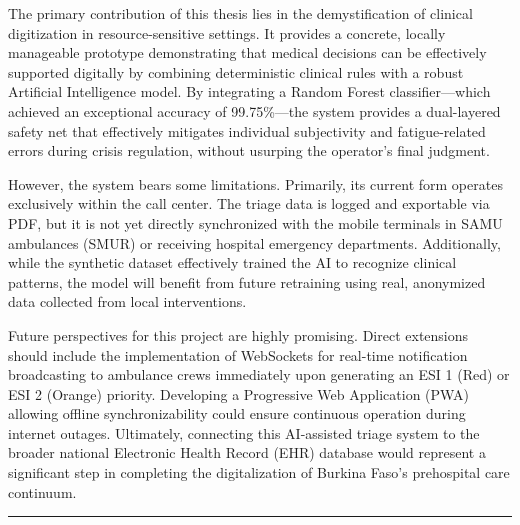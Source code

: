 \documentclass[a4paper,12pt,oneside]{report}
\begin{document}
The primary contribution of this thesis lies in the demystification of clinical digitization in resource-sensitive settings. It provides a concrete, locally manageable prototype demonstrating that medical decisions can be effectively supported digitally by combining deterministic clinical rules with a robust Artificial Intelligence model. By integrating a Random Forest classifier—which achieved an exceptional accuracy of 99.75\%—the system provides a dual-layered safety net that effectively mitigates individual subjectivity and fatigue-related errors during crisis regulation, without usurping the operator's final judgment.

However, the system bears some limitations. Primarily, its current form operates exclusively within the call center. The triage data is logged and exportable via PDF, but it is not yet directly synchronized with the mobile terminals in SAMU ambulances (SMUR) or receiving hospital emergency departments. Additionally, while the synthetic dataset effectively trained the AI to recognize clinical patterns, the model will benefit from future retraining using real, anonymized data collected from local interventions.

Future perspectives for this project are highly promising. Direct extensions should include the implementation of WebSockets for real-time notification broadcasting to ambulance crews immediately upon generating an ESI 1 (Red) or ESI 2 (Orange) priority. Developing a Progressive Web Application (PWA) allowing offline synchronizability could ensure continuous operation during internet outages. Ultimately, connecting this AI-assisted triage system to the broader national Electronic Health Record (EHR) database would represent a significant step in completing the digitalization of Burkina Faso's prehospital care continuum.

\vspace{1cm}
\begin{center}
\rule{0.5\textwidth}{0.4pt}
\end{center}



\end{document}
